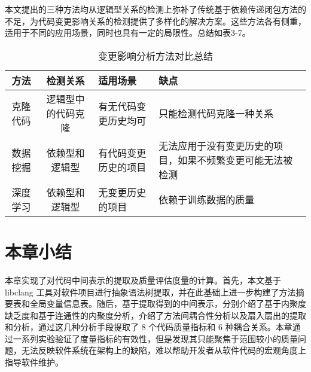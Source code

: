     
    
    本文提出的三种方法均从逻辑型关系的检测上弥补了传统基于依赖传递闭包方法的不足，为代码变更影响关系的检测提供了多样化的解决方案。这些方法各有侧重，适用于不同的应用场景，同时也具有一定的局限性。总结如表3-7。
    
    
    \begin{table}[htbp]
    \caption{变更影响分析方法对比总结}
    \vspace{0.5em}\centering\wuhao
    \begin{tabular}{ccp{4cm}p{4cm}}
    \toprule
    方法& 检测关系 & 适用场景 & 缺点\\
    \midrule
    克隆代码 & 逻辑型中的代码克隆 & 有无代码变更历史均可 & 只能检测代码克隆一种关系\\
    数据挖掘  & 依赖型和逻辑型 & 有代码变更历史的项目 & 无法应用于没有变更历史的项目，如果不频繁变更可能无法被检测 \\
    深度学习  & 依赖型和逻辑型 & 无变更历史的项目 & 依赖于训练数据的质量 \\
    \bottomrule
    \end{tabular}
    \end{table}



\section{本章小结}

本章实现了对代码中间表示的提取及质量评估度量的计算。首先，本文基于 libclang 工具对软件项目进行抽象语法树提取，并在此基础上进一步构建了方法摘要表和全局变量信息表。随后，基于提取得到的中间表示，分别介绍了基于内聚度缺乏度和基于连通性的内聚度分析，介绍了方法间耦合性分析以及扇入扇出的提取和分析，通过这几种分析手段提取了 8 个代码质量指标和 6 种耦合关系。本章通过一系列实验验证了度量指标的有效性，但是发现其只能聚焦于范围较小的质量问题，无法反映软件系统在架构上的缺陷，难以帮助开发者从软件代码的宏观角度上指导软件维护。









